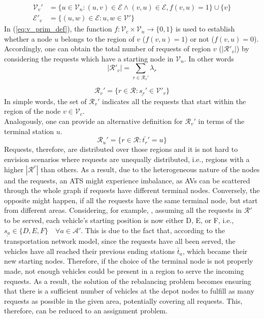 \begin{align}
\mathcal{V}_v' &= \{ u \in \mathcal{V}_n : (u, v) \in \mathcal{E} \wedge (v, u) \in \mathcal{E} , f(v,u) = 1 \} \cup \{ v\} \label{eq:v_prim_def}\\
\mathcal{E}'_v &= \{ (u, w) \in \mathcal{E} : u, w \in \mathcal{V}' \} 
\end{align}
In (\ref{eq:v_prim_def}), the function $f :  \mathcal{V}_c \times \mathcal{V}_n \rightarrow \{0,1\}$ is used to establish whether a node $u$ belongs to the region of $v$ ($f(v,u) = 1$) or not ($f(v,u) = 0$). Accordingly, one can obtain the total number of requests of region $v$ ($|\mathcal{R}'_v|$) by considering the requests which have a starting node in $\mathcal{V}_n$. In other words
\begin{equation}
|\mathcal{R}'_v| = \sum_{r \in \mathcal{R}_v'} \lambda_r
\end{equation}

\begin{equation}
\mathcal{R}_v'= \{ r \in \mathcal{R} : \underline{s_r}' \in \mathcal{V'}_v \} \label{eq:req_per_reg}
\end{equation}
In simple words, the set of $\mathcal{R}_v'$ indicates all the requests that start within the region of the node $v \in \mathcal{V}_c$. \\
Analogously, one can provide an alternative definition for $\mathcal{R}_v'$ in terms of the terminal station $u$.
\begin{equation}
	\mathcal{R}_u'= \{ r \in \mathcal{R} : \bar{t_r}' = u \}%
\end{equation}
Requests, therefore, are distributed over those regions and it is not hard to envision scenarios where requests are unequally distributed, i.e., regions with a higher $|\mathcal{R}^v| $ than others. As a result, due to the heterogeneous nature of the nodes and the requests, an ATS might experience imbalance, as AVs can be scattered through the whole graph if requests have different terminal nodes. Conversely, the opposite might happen, if all the requests have the same terminal node, but start from different areas. Considering, for example, , assuming all the requests in $\mathcal{R}'$ to be served, each vehicle's starting position is now either D, E, or F, i.e., $\underline{s_a} \in \{D, E, F\} \quad \forall a \in \mathcal{A}'$. This is due to the fact that, according to the transportation network model, since the requests have all been served, the vehicles have all reached their previous ending stations $\bar{t}_a$, which became their new starting nodes. Therefore, if the choice of the terminal node is not properly made, not enough vehicles could be present in a region to serve the incoming requests. As a result, the solution of the rebalancing problem becomes ensuring that there is a sufficient number of vehicles at the depot nodes to fulfill as many requests as possible in the given area, potentially covering all requests. This, therefore, can be reduced to an assignment problem.
